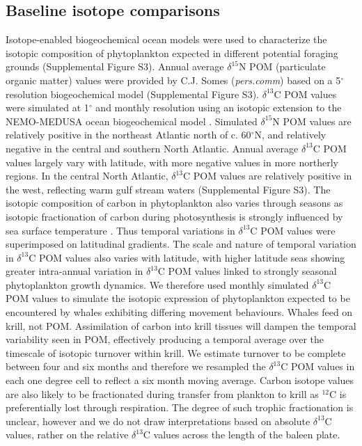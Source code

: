 \documentclass[9pt,twocolumn,twoside,lineno]{pnas-new}
\begin{document}
{\subsection*{Baseline isotope comparisons}
Isotope-enabled biogeochemical ocean models \cite{magozzi2017using,schmittner2016complementary} were used to characterize the isotopic composition of phytoplankton expected in different potential foraging grounds (Supplemental Figure S3). 
Annual average $\delta^{15}$N POM (particulate organic matter) values were provided by C.J. Somes (\textit{pers.comm}) based on a 5$^{\circ}$ resolution biogeochemical model (Supplemental Figure S3). 
$\delta^{13}$C POM values were simulated at 1$^{\circ}$ and monthly resolution using an isotopic extension to the NEMO-MEDUSA ocean biogeochemical model \cite{magozzi2017using,yool2013medusa}. 
Simulated  $\delta^{15}$N POM values are relatively positive in the northeast Atlantic north of c. 60$^{\circ}$N, and relatively negative in the central and southern North Atlantic. 
Annual average $\delta^{13}$C POM values largely vary with latitude, with more negative values in more northerly regions. 
In the central North Atlantic, $\delta^{13}$C POM values are relatively positive in the west, reflecting warm gulf stream waters (Supplemental Figure S3). 
The isotopic composition of carbon in phytoplankton also varies through seasons as isotopic fractionation of carbon during photosynthesis is strongly influenced by sea surface temperature \cite{magozzi2017using,laws1995dependence}.
Thus temporal variations in $\delta^{13}$C POM values were superimposed on latitudinal gradients. 
The scale and nature of temporal variation in $\delta^{13}$C POM values also varies with latitude, with higher latitude seas showing greater intra-annual variation in $\delta^{13}$C POM values linked to strongly seasonal phytoplankton growth dynamics. 
We therefore used monthly simulated $\delta^{13}$C POM values to simulate the isotopic expression of phytoplankton expected to be encountered by whales exhibiting differing movement behaviours.
Whales feed on krill, not POM. 
Assimilation of carbon into krill tissues will dampen the temporal variability seen in POM, effectively producing a temporal average over the timescale of isotopic turnover within krill. 
We estimate turnover to be complete between four and six months and therefore we resampled the $\delta^{13}$C POM values in each one degree cell to reflect a six month moving average. 
Carbon isotope values are also likely to be fractionated during transfer from plankton to krill as $^{12}$C  is preferentially lost through respiration. 
The degree of such trophic fractionation is unclear, however and we do not draw interpretations based on absolute $\delta^{13}$C values, rather on the relative $\delta^{13}$C  values across the length of the baleen plate.

}
\end{document}
